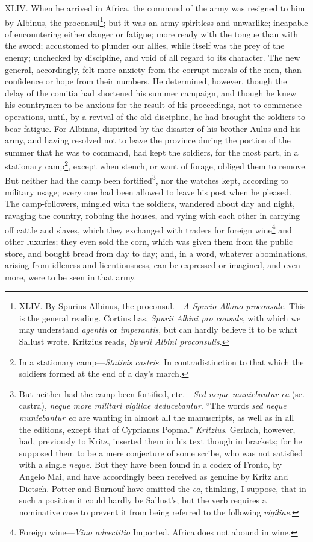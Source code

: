 XLIV. When he arrived in Africa, the command of the army was resigned
to him by Albinus, the proconsul\footnote{XLIV. By Spurius Albinus, the proconsul.—\emph{A Spurio Albino
proconsule}. This is the general reading. Cortius has, \emph{Spurii Albini
pro consule}, with which we may understand \emph{agentis} or \emph{imperantis},
but can hardly believe it to be what Sallust wrote. Kritzius reads,
\emph{Spurii Albini proconsulis}.}; but it was an army spiritless
and unwarlike; incapable of encountering either danger or fatigue;
more ready with the tongue than with the sword; accustomed to plunder
our allies, while itself was the prey of the enemy; unchecked by
discipline, and void of all regard to its character. The new general,
accordingly, felt more anxiety from the corrupt morals of the men,
than confidence or hope from their numbers. He determined, however,
though the delay of the comitia had shortened his summer campaign, and
though he knew his countrymen to be anxious for the result of his
proceedings, not to commence operations, until, by a revival of the
old discipline, he had brought the soldiers to bear fatigue. For
Albinus, dispirited by the disaster of his brother Aulus and his army,
and having resolved not to leave the province during the portion of
the summer that he was to command, had kept the soldiers, for the most
part, in a stationary camp\footnote{In a stationary camp—\emph{Stativis castris}. In contradistinction
to that which the soldiers formed at the end of a day's march.}, except when stench, or want of
forage, obliged them to remove. But neither had the camp been
fortified\footnote{But neither had the camp been fortified, etc.—\emph{Sed neque
muniebantur ea} (se. castra), \emph{neque more militari vigiliae
deducebantur}. ``The words \emph{sed neque muniebantur ea} are wanting in
almost all the manuscripts, as well as in all the editions, except
that of Cyprianus Popma.'' \emph{Kritzius}. Gerlach, however, had,
previously to Kritz, inserted them in his text though in brackets;
for he supposed them to be a mere conjecture of some scribe, who was
not satisfied with a single \emph{neque}. But they have been found in a
codex of Fronto, by Angelo Mai, and have accordingly been received
as genuine by Kritz and Dietsch. Potter and Burnouf have omitted the
\emph{ea}, thinking, I suppose, that in such a position it could hardly be
Sallust's; but the verb requires a nominative case to prevent it from
being referred to the following \emph{vigiliae}.}, nor the watches kept, according to military usage;
every one had been allowed to leave his post when he pleased. The
camp-followers, mingled with the soldiers, wandered about day and
night, ravaging the country, robbing the houses, and vying with each
other in carrying off cattle and slaves, which they exchanged with
traders for foreign wine\footnote{Foreign wine—\emph{Vino advectitio} Imported. Africa does not
abound in wine.} and other luxuries; they even sold the
corn, which was given them from the public store, and bought bread
from day to day; and, in a word, whatever abominations, arising from
idleness and licentiousness, can be expressed or imagined, and even
more, were to be seen in that army.

